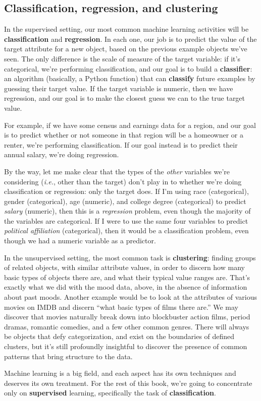 \subsection{Classification, regression, and clustering}


In the supervised setting, our most common machine learning activities will be
\textbf{classification} and \textbf{regression}. In each one, our job is to
predict the value of the target attribute for a new object, based on the
previous example objects we've seen. The only difference is the scale of
measure of the target variable: if it's categorical, we're performing
classification, and our goal is to build a \textbf{classifier}: an algorithm
(basically, a Python function) that can \textbf{classify} future examples by
guessing their target value. If the target variable is numeric, then we have
regression, and our goal is to make the closest guess we can to the true target
value.

For example, if we have some census and earnings data for a region, and our
goal is to predict whether or not someone in that region will be a homeowner or
a renter, we're performing classification. If our goal instead is to predict
their annual salary, we're doing regression.

By the way, let me make clear that the types of the \textit{other} variables
we're considering (\textit{i.e.}, other than the target) don't play in to
whether we're doing classification or regression: only the target does. If I'm
using race (categorical), gender (categorical), age (numeric), and college
degree (categorical) to predict \textit{salary} (numeric), then this is a
\textit{regression} problem, even though the majority of the variables are
categorical. If I were to use the same four variables to predict
\textit{political affiliation} (categorical), then it would be a classification
problem, even though we had a numeric variable as a predictor.


In the unsupervised setting, the most common task is \textbf{clustering}:
finding groups of related objects, with similar attribute values, in order to
discern how many basic types of objects there are, and what their typical value
ranges are. That's exactly what we did with the mood data, above, in the
absence of information about past moods. Another example would be to look at
the attributes of various movies on IMDB and discern ``what basic types of
films there are.'' We may discover that movies naturally break down into
blockbuster action films, period dramas, romantic comedies, and a few other
common genres. There will always be objects that defy categorization, and exist
on the boundaries of defined clusters, but it's still profoundly insightful to
discover the presence of common patterns that bring structure to the data.

\bigskip

Machine learning is a big field, and each aspect has its own techniques and
deserves its own treatment. For the rest of this book, we're going to
concentrate only on \textbf{supervised} learning, specifically the task of
\textbf{classification}.
